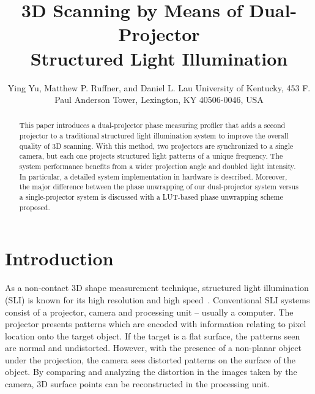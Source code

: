 \documentclass[]{spie}  %
\title{3D Scanning by Means of Dual-Projector \\ Structured Light Illumination}
\author{Ying Yu\supit{a}, Matthew P. Ruffner\supit{a}, and Daniel L. Lau\supit{a}
\skiplinehalf
\supit{a}University of Kentucky, 453 F. Paul Anderson Tower, Lexington, KY 40506-0046, USA
}
\begin{document}
 
  \maketitle 

\begin{abstract}
This paper introduces a dual-projector phase measuring profiler that adds a second projector to a traditional structured light illumination system to improve the overall quality of 3D scanning. With this method, two projectors are synchronized to a single camera, but each one projects structured light patterns of a unique frequency. The system performance benefits from a wider projection angle and doubled light intensity. In particular, a detailed system implementation in hardware is described. Moreover, the major difference between the phase unwrapping of our dual-projector system versus a single-projector system is discussed with a LUT-based phase unwrapping scheme proposed. 
\end{abstract}



\section{Introduction}
\label{sec:intro}  %
As a non-contact 3D shape measurement technique, structured light illumination (SLI) is known for its high resolution and high speed~\cite{chen00}. Conventional SLI systems consist of a projector, camera and processing unit -- usually a computer. The projector presents patterns which are encoded with information relating to pixel location onto the target object. If the target is a flat surface, the patterns seen are normal and undistorted. However, with the presence of a non-planar object under the projection, the camera sees distorted patterns on the surface of the object. By comparing and analyzing the distortion in the images taken by the camera, 3D surface points can be reconstructed in the processing unit.
\end{document}
